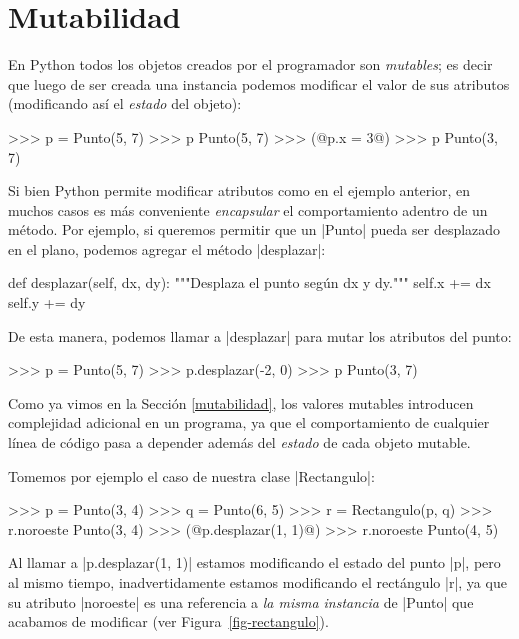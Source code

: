 \section{Mutabilidad}

En Python todos los objetos creados por el programador son \emph{mutables}; es
decir que luego de ser creada una instancia podemos modificar el valor de sus
atributos (modificando así el \emph{estado} del objeto):

\begin{codigo-python-sn}
>>> p = Punto(5, 7)
>>> p
Punto(5, 7)
>>> (@p.x = 3@)
>>> p
Punto(3, 7)
\end{codigo-python-sn}

Si bien Python permite modificar atributos como en el ejemplo anterior, en
muchos casos es más conveniente \emph{encapsular} el comportamiento adentro de
un método. Por ejemplo, si queremos permitir que un |Punto| pueda ser
desplazado en el plano, podemos agregar el método |desplazar|:

\begin{codigo-python-sn}
    def desplazar(self, dx, dy):
        """Desplaza el punto según dx y dy."""
        self.x += dx
        self.y += dy
\end{codigo-python-sn}

De esta manera, podemos llamar a |desplazar| para mutar los atributos del
punto:

\begin{codigo-python-sn}
>>> p = Punto(5, 7)
>>> p.desplazar(-2, 0)
>>> p
Punto(3, 7)
\end{codigo-python-sn}

Como ya vimos en la Sección \ref{mutabilidad}, los valores mutables introducen
complejidad adicional en un programa, ya que el comportamiento de cualquier
línea de código pasa a depender además del \emph{estado} de cada objeto
mutable.

Tomemos por ejemplo el caso de nuestra clase |Rectangulo|:

\begin{codigo-python-sn}
>>> p = Punto(3, 4)
>>> q = Punto(6, 5)
>>> r = Rectangulo(p, q)
>>> r.noroeste
Punto(3, 4)
>>> (@p.desplazar(1, 1)@)
>>> r.noroeste
Punto(4, 5)
\end{codigo-python-sn}

Al llamar a |p.desplazar(1, 1)| estamos modificando el estado del punto |p|,
pero al mismo tiempo, inadvertidamente estamos modificando el rectángulo |r|,
ya que su atributo |noroeste| es una referencia a \emph{la misma instancia} de
|Punto| que acabamos de modificar (ver Figura~\ref{fig-rectangulo}).

